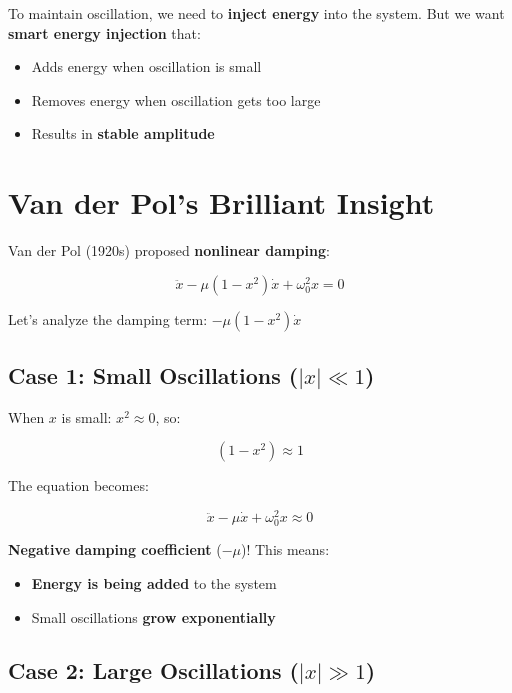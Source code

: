 \documentclass{article}
\begin{document}
To maintain oscillation, we need to \textbf{inject energy} into the system. But we want \textbf{smart energy injection} that:
\begin{itemize}
    \item Adds energy when oscillation is small
    \item Removes energy when oscillation gets too large
    \item Results in \textbf{stable amplitude}
\end{itemize}

\section{Van der Pol's Brilliant Insight}

Van der Pol (1920s) proposed \textbf{nonlinear damping}:

\begin{equation}
\ddot{x} - \mu(1 - x^2)\dot{x} + \omega_0^2 x = 0
\end{equation}

Let's analyze the damping term: $-\mu(1 - x^2)\dot{x}$

\subsection{Case 1: Small Oscillations ($|x| \ll 1$)}

When $x$ is small: $x^2 \approx 0$, so:

\begin{equation}
(1 - x^2) \approx 1
\end{equation}

The equation becomes:

\begin{equation}
\ddot{x} - \mu\dot{x} + \omega_0^2 x \approx 0
\end{equation}

\textbf{Negative damping coefficient} ($-\mu$)! This means:
\begin{itemize}
    \item \textbf{Energy is being added} to the system
    \item Small oscillations \textbf{grow exponentially}
\end{itemize}

\subsection{Case 2: Large Oscillations ($|x| \gg 1$)}
\end{document}
